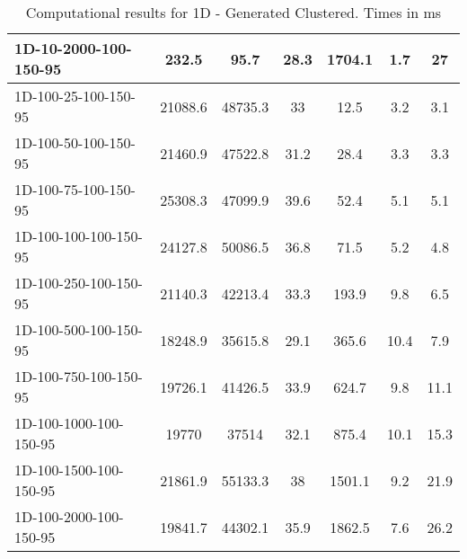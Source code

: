 \documentclass{article}
\begin{document}
\begin{table}[h]
\begin{center}
\begin{tabular}{|l||c|c|c|c|c|c|}
            1D-10-2000-100-150-95                    & 232.5   & 95.7       & 28.3       & 1704.1      & 1.7       & 27         \\
            \hline
            1D-100-25-100-150-95                       & 21088.6 & 48735.3    & 33         & 12.5        & 3.2       & 3.1        \\
            1D-100-50-100-150-95                       & 21460.9 & 47522.8    & 31.2       & 28.4        & 3.3       & 3.3        \\
            1D-100-75-100-150-95                       & 25308.3 & 47099.9    & 39.6       & 52.4        & 5.1       & 5.1        \\
            1D-100-100-100-150-95                      & 24127.8 & 50086.5    & 36.8       & 71.5        & 5.2       & 4.8        \\
            1D-100-250-100-150-95                      & 21140.3 & 42213.4    & 33.3       & 193.9       & 9.8       & 6.5        \\
            1D-100-500-100-150-95                      & 18248.9 & 35615.8    & 29.1       & 365.6       & 10.4      & 7.9        \\
            1D-100-750-100-150-95                      & 19726.1 & 41426.5    & 33.9       & 624.7       & 9.8       & 11.1       \\
            1D-100-1000-100-150-95                     & 19770   & 37514      & 32.1       & 875.4       & 10.1      & 15.3       \\
            1D-100-1500-100-150-95                     & 21861.9 & 55133.3    & 38         & 1501.1      & 9.2       & 21.9       \\
            1D-100-2000-100-150-95                     & 19841.7 & 44302.1    & 35.9       & 1862.5      & 7.6       & 26.2       \\
            \hline
        \end{tabular}
    \end{center}
        \caption{Computational results for 1D - Generated Clustered. Times in ms}
        \label{tab:1d_res_generated}
    \end{table}
\end{document}
